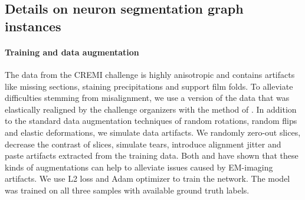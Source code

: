 \subsection{Details on neuron segmentation graph instances}\label{sec:cremi_details}
\paragraph{Training and data augmentation} The data from the CREMI challenge is highly \linebreak anisotropic and contains artifacts like missing sections, staining precipitations and support film folds. 
To alleviate difficulties stemming from misalignment, we use a version of the data that was elastically realigned by the challenge organizers with the method of \cite{saalfeld2012elastic}.
In addition to the standard data augmentation techniques of random rotations, random flips and  elastic deformations, we simulate data artifacts.
We randomly zero-out slices, decrease the contrast of slices, simulate tears, introduce alignment jitter and paste artifacts extracted from the training data. Both \cite{funke2018large} and \cite{lee2017superhuman} have shown
that these kinds of augmentations can help to alleviate issues caused by EM-imaging artifacts.
We use L2 loss and Adam optimizer to train the network. The model was trained on all three samples with available ground truth labels.  


